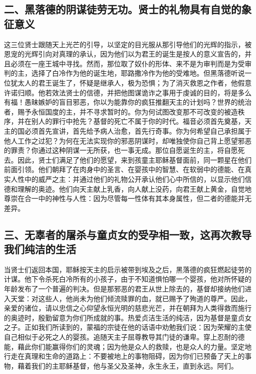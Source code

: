 
\subsection{二、黑落德的阴谋徒劳无功。贤士的礼物具有自觉的象征意义}

这三位贤士跟随天上光芒的引导，以坚定的目光服从那引导他们的光辉的指示，被恩宠的光辉引向对真理的承认，因为他们以为君王的诞生是按人的意义宣告的，并且必须在一座王城中寻找。然而，那位取了奴仆的形体、来不是为审判而是为受审判的主，选择了白冷作为他的诞生地，耶路撒冷作为他的受难地。但黑落德听说一位犹太人的君王诞生了，怀疑是继承人，极为恐惧；为了消灭救恩之作者，他假意许诺归顺。他若效法贤士的信德，并把他图谋诡诈之事用于虔诚的目的，将是多么有福！愚昧嫉妒的盲目邪恶，你以为能靠你的疯狂推翻天主的计划吗？世界的统治者，赐予永恒国度的主，并不寻求暂时的。你为何试图改变那不可改变的被造秩序，并在别人的罪行中抢先？基督的死亡不属于你的时代。福音必须首先奠基，天主的国必须首先宣讲，首先给予病人治愈，首先行奇事。你为何希望自己承担属于他人工作之过犯？为何在无法实现你的邪恶阴谋时，却唯独使你自己背上愿望邪恶的罪责？你通过这种阴谋一无所获，也一事无成。那位自愿诞生的主，将自愿死去。因此，贤士们满足了他们的愿望，来到孩童主耶稣基督面前，同一颗星在他们前面引领。他们朝拜了在肉身中的圣言、在婴孩中的智慧、在软弱中的德能、在真实人性中的威严之主：并通过他们的礼物公开承认他们心中所信的，以显示他们信德和理解的奥迹。他们向天主献上乳香，向人献上没药，向君王献上黄金，自觉地尊崇在合一中的神性与人性：因为尽管每一性体有其本身属性，但二者的德能并无差异。\par


\subsection{三、无辜者的屠杀与童贞女的受孕相一致，这再次教导我们纯洁的生活}

当贤士们返回本国，耶稣按天主的启示被带到埃及之后，黑落德的疯狂燃起徒劳的计谋。他下令杀死白冷所有的小孩子，由于不知道惧怕哪一个婴孩，他对所怀疑的年龄发布了一个普遍的判决。但是那邪恶的君王从世上除去的，基督却接纳他们进入天堂：对这些人，他尚未为他们倾流赎罪的血，就已赐予了殉道的尊严。因此，亲爱的诸位，请以忠信之心仰望永恒光明的慈悲光芒，并在朝拜为人类得救而施行的奥迹时，殷勤留意为你们所成就的事。热爱贞洁生活的纯洁，因为基督是童贞女之子。正如我们所读到的，蒙福的宗徒在他的话语中劝勉我们说：因为荣耀的主使自己相似于必死之人的婴孩。追随天主子屈尊教导其门徒的谦卑。穿上忍耐的德能，藉此你们能赢得你们的灵魂；因为他是众人的救赎，也是众人的力量。坚定地行走在真理和生命的道路上：不要被地上的事物阻碍，因为你们已预备了天上的事物，藉着我们的主耶稣基督，他与圣父及圣神，永生永王，直到永远。阿们。\par

